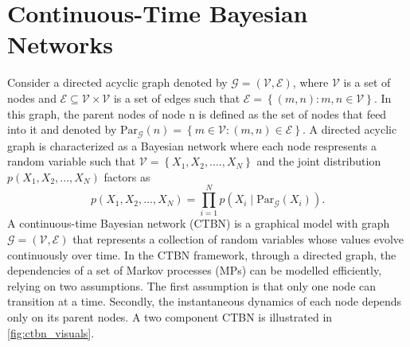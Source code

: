 \section{Continuous-Time Bayesian Networks}
\label{sec:ctbn_intro}
Consider a directed acyclic graph denoted by $ \mathcal{G} = \left( \mathcal{V}, \mathcal{E}\right) $, where $ \mathcal{V} $ is a set of nodes and $ \mathcal{E} \subseteq \mathcal{V} \times \mathcal{V} $ is a set of edges such that $ \mathcal{E} = \left\lbrace \left( m, n\right) : m, n \in \mathcal{V} \right\rbrace $. In this graph, the parent nodes of node n is defined as the set of nodes that feed into it and denoted by $ \mathrm{Par}_{\mathcal{G}}(n) = \left\lbrace m \in \mathcal{V} : \left( m, n \right) \in \mathcal{E} \right\rbrace $. A directed acyclic graph is characterized as a Bayesian network where each node respresents a random variable such that $ \mathcal{V} = \left\lbrace X_1, X_2, ...., X_N\right\rbrace  $ and the joint distribution $ p(X_1, X_2, ..., X_N) $ factors as 
\begin{equation}
p(X_1, X_2, ..., X_N) = \prod_{i=1}^{N} p(X_i \mid \mathrm{Par}_{\mathcal{G}}(X_i)).
\end{equation}
A continuous-time Bayesian network (CTBN) is a graphical model with graph $\mathcal{G} = \left( \mathcal{V}, \mathcal{E}\right) $ that represents a collection of random variables whose values evolve continuously over time. In the CTBN framework, through a directed graph, the dependencies of a set of Markov processes (MPs) can be modelled efficiently, relying on two assumptions. The first assumption is that only one node can transition at a time. Secondly, the instantaneous dynamics of each node depends only on its parent nodes. \cite{Cohn2010a, Nodelman1995} A two component CTBN is illustrated in \autoref{fig:ctbn_visuals}.
